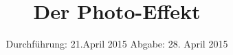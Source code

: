 
\subject{Anfängerpraktikum V500}
\title{Der Photo-Effekt}
\date{
  Durchführung: 21.April 2015
  \hspace{3em}
  Abgabe: 28. April 2015
}


\maketitle
\thispagestyle{empty}
\newpage





\nocite{skript}
\printbibliography
